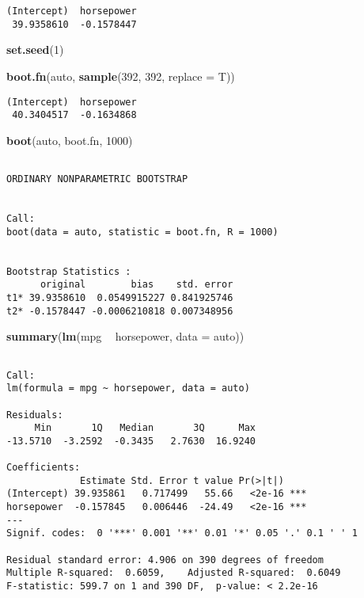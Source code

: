 \documentclass[12pt,]{report}
\newenvironment{Shaded}{\begin{snugshade}}{\end{snugshade}}
\newcommand{\DataTypeTok}[1]{\textcolor[rgb]{0.13,0.29,0.53}{#1}}
\newcommand{\DecValTok}[1]{\textcolor[rgb]{0.00,0.00,0.81}{#1}}
\newcommand{\KeywordTok}[1]{\textcolor[rgb]{0.13,0.29,0.53}{\textbf{#1}}}
\newcommand{\NormalTok}[1]{#1}
\newcommand{\OperatorTok}[1]{\textcolor[rgb]{0.81,0.36,0.00}{\textbf{#1}}}
\newcommand{\StringTok}[1]{\textcolor[rgb]{0.31,0.60,0.02}{#1}}
\begin{document}
\begin{verbatim}
(Intercept)  horsepower 
 39.9358610  -0.1578447 
\end{verbatim}

\begin{Shaded}
\begin{Highlighting}[]
\KeywordTok{set.seed}\NormalTok{(}\DecValTok{1}\NormalTok{)}

\KeywordTok{boot.fn}\NormalTok{(auto, }\KeywordTok{sample}\NormalTok{(}\DecValTok{392}\NormalTok{, }\DecValTok{392}\NormalTok{, }\DataTypeTok{replace =}\NormalTok{ T))}
\end{Highlighting}
\end{Shaded}

\begin{verbatim}
(Intercept)  horsepower 
 40.3404517  -0.1634868 
\end{verbatim}

\begin{Shaded}
\begin{Highlighting}[]
\KeywordTok{boot}\NormalTok{(auto, boot.fn, }\DecValTok{1000}\NormalTok{)}
\end{Highlighting}
\end{Shaded}

\begin{verbatim}

ORDINARY NONPARAMETRIC BOOTSTRAP


Call:
boot(data = auto, statistic = boot.fn, R = 1000)


Bootstrap Statistics :
      original        bias    std. error
t1* 39.9358610  0.0549915227 0.841925746
t2* -0.1578447 -0.0006210818 0.007348956
\end{verbatim}

\begin{Shaded}
\begin{Highlighting}[]
\KeywordTok{summary}\NormalTok{(}\KeywordTok{lm}\NormalTok{(mpg }\OperatorTok{~}\StringTok{ }\NormalTok{horsepower, }\DataTypeTok{data =}\NormalTok{ auto))}
\end{Highlighting}
\end{Shaded}

\begin{verbatim}

Call:
lm(formula = mpg ~ horsepower, data = auto)

Residuals:
     Min       1Q   Median       3Q      Max 
-13.5710  -3.2592  -0.3435   2.7630  16.9240 

Coefficients:
             Estimate Std. Error t value Pr(>|t|)    
(Intercept) 39.935861   0.717499   55.66   <2e-16 ***
horsepower  -0.157845   0.006446  -24.49   <2e-16 ***
---
Signif. codes:  0 '***' 0.001 '**' 0.01 '*' 0.05 '.' 0.1 ' ' 1

Residual standard error: 4.906 on 390 degrees of freedom
Multiple R-squared:  0.6059,    Adjusted R-squared:  0.6049 
F-statistic: 599.7 on 1 and 390 DF,  p-value: < 2.2e-16
\end{verbatim}
\end{document}
